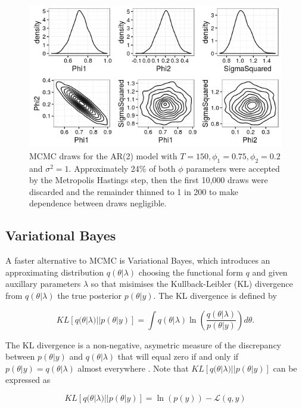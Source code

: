 \documentclass[12pt,a4paper]{article}%
\numberwithin{equation}{section}
\begin{document}
\begin{figure}[h]
\label{MCMCplot}
\centering
\includegraphics[scale = 0.5]{MCMC.png}
\caption{MCMC draws for the AR(2) model with $T = 150, \phi_1 = 0.75, \phi_2 = 0.2$ and $\sigma^2 = 1$. Approximately 24\% of both $\phi$ parameters were accepted by the Metropolis Hastings step, then the first 10,000 draws were discarded and the remainder thinned to 1 in 200 to make dependence between draws negligible.}
\end{figure}

\subsection{Variational Bayes}

A faster alternative to MCMC is Variational Bayes, which introduces an approximating distribution $q(\theta | \lambda)$ choosing the functional form $q$ and given auxillary parameters $\lambda$ so that  misimises the Kullback-Leibler (KL) divergence \citep{Kullback1951} from $q(\theta | \lambda)$ the true posterior $p(\theta | y)$. The KL divergence is defined by

\begin{equation}
\label{KL-def}
KL[q(\theta | \lambda)||p(\theta | y)] = \int q(\theta | \lambda) \ln \left( \frac{q(\theta | \lambda)}{p(\theta | y)}\right) d\theta.
\end{equation}

The KL divergence is a non-negative, asymetric measure of the discrepancy between $p(\theta | y)$ and $q(\theta | \lambda)$ that will equal zero if and only if $p(\theta | y) = q(\theta | \lambda)$ almost everywhere \citep{Bishop2006}. Note that $KL[q(\theta | \lambda)||p(\theta | y)]$ can be expressed as

\begin{equation}
\label{KL-ELBO}
KL[q(\theta | \lambda)||p(\theta | y)] = \ln(p(y)) - \mathcal{L}(q, y)
\end{equation}
\end{document}
